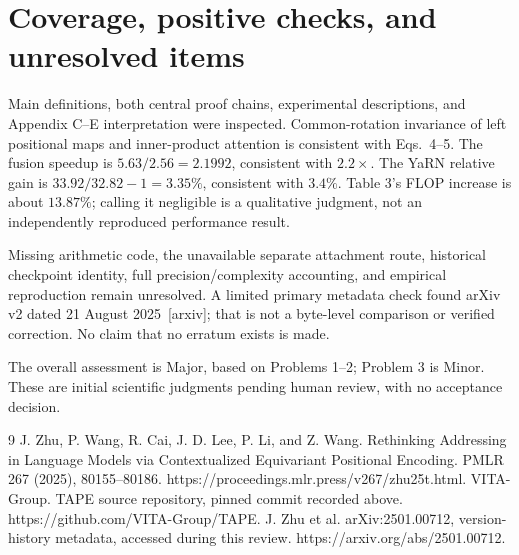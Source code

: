 \documentclass[10pt]{article}
\begin{document}
\section*{Coverage, positive checks, and unresolved items}
Main definitions, both central proof chains, experimental descriptions, and Appendix C–E interpretation were inspected. Common-rotation invariance of left positional maps and inner-product attention is consistent with Eqs. 4–5. The fusion speedup is \(5.63/2.56=2.1992\), consistent with \(2.2\times\). The YaRN relative gain is \(33.92/32.82-1=3.35\%\), consistent with \(3.4\%\). Table 3’s FLOP increase is about \(13.87\%\); calling it negligible is a qualitative judgment, not an independently reproduced performance result.\par
Missing arithmetic code, the unavailable separate attachment route, historical checkpoint identity, full precision/complexity accounting, and empirical reproduction remain unresolved. A limited primary metadata check found arXiv v2 dated 21 August 2025 [arxiv]; that is not a byte-level comparison or verified correction. No claim that no erratum exists is made.\par
The overall assessment is Major, based on Problems 1–2; Problem 3 is Minor. These are initial scientific judgments pending human review, with no acceptance decision.\par
9 J. Zhu, P. Wang, R. Cai, J. D. Lee, P. Li, and Z. Wang. Rethinking Addressing in Language Models via Contextualized Equivariant Positional Encoding. PMLR 267 (2025), 80155–80186. https://proceedings.mlr.press/v267/zhu25t.html. VITA-Group. TAPE source repository, pinned commit recorded above. https://github.com/VITA-Group/TAPE. J. Zhu et al. arXiv:2501.00712, version-history metadata, accessed during this review. https://arxiv.org/abs/2501.00712.\par
\end{document}
